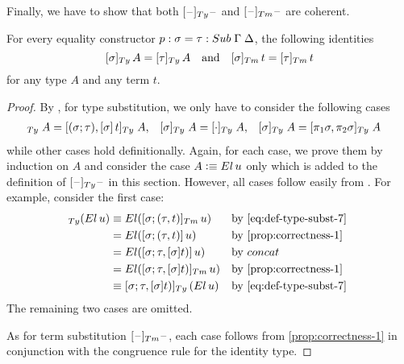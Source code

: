 \documentclass[a4paper,UKenglish,numberwithinsect,cleveref,thm-restate]{lipics-v2021}
\newcommand{\danger}{\marginpar[\hfill\dbend]{\dbend\hfill}}
\begin{document}
Finally, we have to show that both $[\blank]_{\Ty}\blank$ and $[\blank]_{\Tm}\blank$ are coherent.
\begin{proposition}[Coherence] \label{prop:coherence-2}
  For every equality constructor $p : \sigma = \tau : \Sub\;\Gamma\;\Delta$, the following identities
  \danger
  \[
    [\sigma]_{\Ty}\,A = [\tau]_{\Ty}\,A
    \quad\text{and}\quad
    [\sigma]_{\Tm}\,t = [\tau]_{\Tm}\,t
  \]
  for any type $A$ and any term $t$.
\end{proposition}
\begin{proof}
  By , for type substitution, we only have to consider the following cases 
  \begin{align*}
    [\sigma; (\tau, t)]_{\Ty} \;A    & = [(\sigma;\tau), [\sigma]\, t]_{\Ty}\;A,
                                     & [\sigma]_{\Ty} \;A               & = [\emptyctx]_{\Ty}\;A,
                                     & [\sigma]_{\Ty} \;A               & = [\pi_1\sigma, \pi_2\sigma]_{\Ty}\;A
  \end{align*}
  while other cases hold definitionally.
  Again, for each case, we prove them by induction on $A$ and consider the case $A \defeq \El\,u$ only which is added to the definition of $[\blank]_{\Ty}\blank$ in this section. 
  However, all cases follow easily from .
  For example, consider the first case:
  \begin{align*}
    [\sigma; (\tau, t)]_{\Ty}(\El\,u) & \judgeq \El([\sigma; (\tau, t)]_{\Tm}\,u) && \text{by \eqref{eq:def-type-subst-7}} \\
                                      & = \El( [\sigma; (\tau, t)]\,u)            && \text{by \cref{prop:correctness-1}} \\
                                      & = \El( [\sigma; \tau, [\sigma]t)]\,u)     && \text{by $\mathsf{concat}$} \\
                                      & = \El( [\sigma; \tau, [\sigma]t)]_{\Tm}\,u) && \text{by \cref{prop:correctness-1}} \\
                                      & \judgeq [\sigma; \tau, [\sigma]t)]_{\Ty}\left(\El\,u\right) && \text{by \eqref{eq:def-type-subst-7} }
  \end{align*}
  The remaining two cases are omitted.

  As for term substitution $[\blank]_{\Tm}\blank$, each case follows from \cref{prop:correctness-1} in conjunction with the congruence rule for the identity type.
\end{proof}
\end{document}
